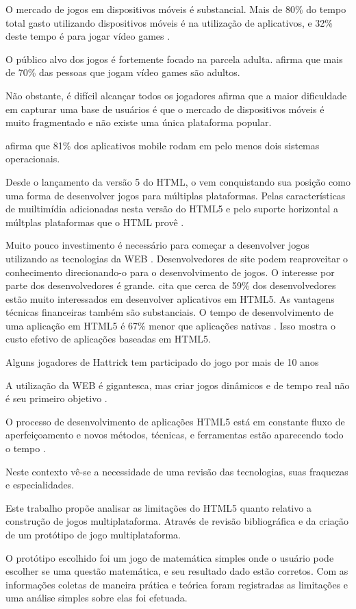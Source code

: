 
O mercado de jogos em dispositivos móveis é substancial.
Mais de 80\% do tempo total gasto utilizando dispositivos móveis é na
utilização de aplicativos, e 32\% deste tempo é para jogar vídeo
games \autocite{HTML5CrossPlatformGameDevelopment}.

O público alvo dos jogos é fortemente focado na parcela adulta.
\autocite{gamebenefits} afirma que mais de 70\% das pessoas que jogam vídeo games são adultos.

Não obstante, é difícil alcançar todos os jogadores
\cite{html5Tradeoffs} afirma que a maior dificuldade em capturar uma
base de usuários é que o mercado de dispositivos móveis é muito
fragmentado e não existe uma única plataforma popular.

\autocite{htmlSurvey} afirma que 81\% dos aplicativos mobile rodam em
pelo menos dois sistemas operacionais.

Desde o lançamento da versão 5 do HTML, o vem conquistando sua
posição como uma forma de desenvolver jogos para múltiplas
plataformas. Pelas características de muiltimídia adicionadas nesta
versão do HTML5 e pelo suporte horizontal a múltplas plataformas que o
HTML provê \autocite{html5Tradeoffs}.

Muito pouco investimento é necessário para começar a desenvolver
jogos utilizando as tecnologias da WEB \autocite{html5mostwanted}.
Desenvolvedores de site podem reaproveitar o conhecimento direcionando-o
para o desenvolvimento de jogos. O interesse por parte dos
desenvolvedores é grande. \autocite{htmlSurvey} cita que cerca de 59\%
dos desenvolvedores estão muito interessados em desenvolver aplicativos
em HTML5.
As vantagens técnicas financeiras também são substanciais.
O tempo de desenvolvimento de uma aplicação em HTML5 é 67\% menor que
aplicações nativas \autocite[pp. 460]{html5Tradeoffs}. Isso mostra o
custo efetivo de aplicações baseadas em HTML5.

Alguns jogadores de Hattrick tem participado do jogo por mais de 
10 anos \autocite{gameCommunities}

A utilização da WEB é gigantesca, mas criar jogos
dinâmicos e de tempo real não é seu primeiro objetivo \autocite{html5mostwanted}.

O processo de desenvolvimento de aplicações HTML5 está em constante
fluxo de aperfeiçoamento e novos métodos, técnicas, e ferramentas
estão aparecendo todo o tempo \autocite{crossPlatformMobileGame}.

Neste contexto vê-se a necessidade de uma revisão das tecnologias, suas fraquezas e especialidades.

Este trabalho propõe analisar as limitações do HTML5 quanto relativo
a construção de jogos multiplataforma. Através de revisão
bibliográfica e da criação de um protótipo de jogo multiplataforma.

O protótipo escolhido foi um jogo de matemática simples onde o
usuário pode escolher se uma questão matemática, e seu resultado dado
estão corretos. Com as informações coletas de maneira prática e
teórica foram registradas as limitações e uma análise simples sobre
elas foi efetuada.



